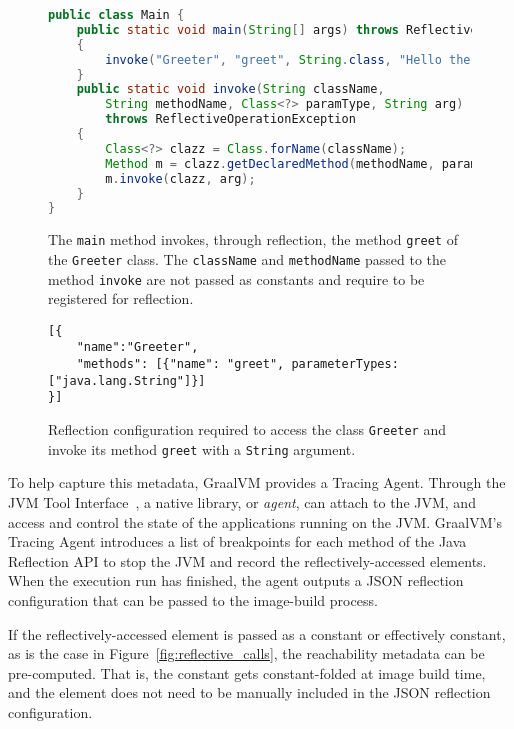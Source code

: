 \begin{figure}[ht]
    \centering
\begin{lstlisting}[language=Java]
public class Main {
    public static void main(String[] args) throws ReflectiveOperationException 
    {
        invoke("Greeter", "greet", String.class, "Hello there!");
    }   
    public static void invoke(String className, 
        String methodName, Class<?> paramType, String arg) 
        throws ReflectiveOperationException 
    {
        Class<?> clazz = Class.forName(className);
        Method m = clazz.getDeclaredMethod(methodName, paramType);
        m.invoke(clazz, arg);
    }
}
\end{lstlisting}
    \caption{The \texttt{main} method invokes, through reflection, the method \texttt{greet} of the \texttt{Greeter} class. The \texttt{className} and \texttt{methodName} passed to the method \texttt{invoke} are not passed as constants and require to be registered for reflection.}
    \label{fig:reflective_calls_invoke}
\end{figure}

\begin{figure}[ht]
    \centering
\begin{lstlisting}
[{
    "name":"Greeter",
    "methods": [{"name": "greet", parameterTypes: ["java.lang.String"]}]
}]    
\end{lstlisting}
    \caption{Reflection configuration required to access the class \texttt{Greeter} and invoke its method \texttt{greet} with a \texttt{String} argument.}
    \label{fig:reflect_config}
\end{figure}

To help capture this metadata, GraalVM provides a Tracing Agent. Through the JVM Tool Interface~\cite{noauthor_jvmtm_nodate}, a native library, or \emph{agent}, can attach to the JVM, and access and control the state of the applications running on the JVM. GraalVM's Tracing Agent introduces a list of breakpoints for each method of the Java Reflection API to stop the JVM and record the reflectively-accessed elements. When the execution run has finished, the agent outputs a JSON reflection configuration that can be passed to the image-build process.

If the reflectively-accessed element is passed as a constant or effectively constant, as is the case in Figure~\ref{fig:reflective_calls}, the reachability metadata can be pre-computed. That is, the constant gets constant-folded at image build time, and the element does not need to be manually included in the JSON reflection configuration.

